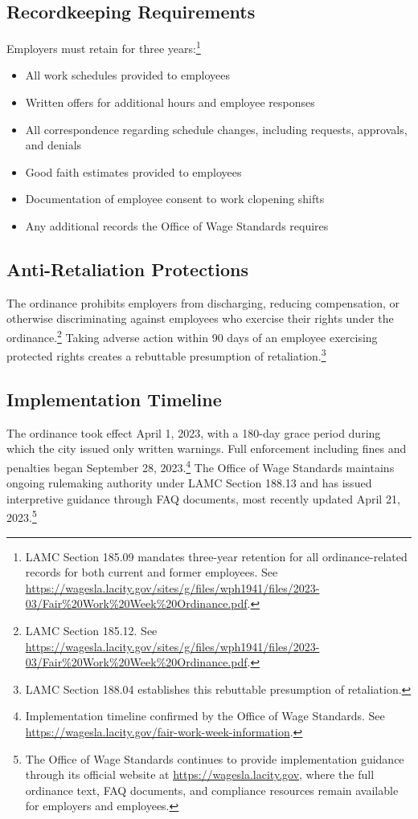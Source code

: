 \documentclass[letterpaper,11pt,leqno]{article}
\theoremstyle{paper}
\begin{document}
\subsection{Recordkeeping Requirements}

Employers must retain for three years:\footnote{LAMC Section 185.09 mandates three-year retention for all ordinance-related records for both current and former employees. See \url{https://wagesla.lacity.gov/sites/g/files/wph1941/files/2023-03/Fair\%20Work\%20Week\%20Ordinance.pdf}.}
\begin{itemize}
   \item All work schedules provided to employees
   \item Written offers for additional hours and employee responses
   \item All correspondence regarding schedule changes, including requests, approvals, and denials
   \item Good faith estimates provided to employees
   \item Documentation of employee consent to work clopening shifts
   \item Any additional records the Office of Wage Standards requires
\end{itemize}

\subsection{Anti-Retaliation Protections}

The ordinance prohibits employers from discharging, reducing compensation, or otherwise discriminating against employees who exercise their rights under the ordinance.\footnote{LAMC Section 185.12. See \url{https://wagesla.lacity.gov/sites/g/files/wph1941/files/2023-03/Fair\%20Work\%20Week\%20Ordinance.pdf}.} Taking adverse action within 90 days of an employee exercising protected rights creates a rebuttable presumption of retaliation.\footnote{LAMC Section 188.04 establishes this rebuttable presumption of retaliation.}

\subsection{Implementation Timeline}

The ordinance took effect April 1, 2023, with a 180-day grace period during which the city issued only written warnings. Full enforcement including fines and penalties began September 28, 2023.\footnote{Implementation timeline confirmed by the Office of Wage Standards. See \url{https://wagesla.lacity.gov/fair-work-week-information}.} The Office of Wage Standards maintains ongoing rulemaking authority under LAMC Section 188.13 and has issued interpretive guidance through FAQ documents, most recently updated April 21, 2023.\footnote{The Office of Wage Standards continues to provide implementation guidance through its official website at \url{https://wagesla.lacity.gov}, where the full ordinance text, FAQ documents, and compliance resources remain available for employers and employees.}
\end{document}
